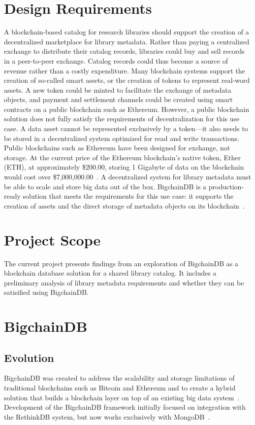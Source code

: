 \section{Design Requirements}
A blockchain-based catalog for research libraries should support the
creation of a decentralized marketplace for library metadata. Rather than
paying a centralized exchange to distribute their catalog records, libraries
could buy and sell records in a peer-to-peer exchange. Catalog records could
thus become a source of revenue rather than a costly expenditure. Many
blockchain systems support the creation of so-called smart assets, or the
creation of tokens to represent real-word assets. A new token could be
minted to facilitate the exchange of metadata objects, and payment and
settlement channels could be created using smart contracts on a public
blockchain such as Ethereum. However, a public blockchain solution does not
fully satisfy the requirements of decentralization for this use case. A data
asset cannot be represented exclusively by a token---it also needs to be
stored in a decentralized system optimized for read and write transactions.
Public blockchains such as Ethereum have been designed for exchange, not
storage. At the current price of the Ethereum blockchain's native token,
Ether (ETH), at approximately \$200.00, storing 1 Gigabyte of data on the
blockchain would cost over \$7,000,000.00~\cite{tHess16}. A decentralized
system for library metadata must be able to scale and store big data out of
the box. BigchainDB is a production-ready solution that meets the
requirements for this use case: it supports the creation of assets and the
direct storage of metadata objects on its blockchain~\cite{bdb18c}.

\section{Project Scope}
The current project presents findings from an exploration of BigchainDB as a 
blockchain database solution for a shared library catalog. It includes a 
preliminary analysis of library metadata requirements and whether they can be 
satisified using BigchainDB.

\section{BigchainDB}
\subsection{Evolution}
BigchainDB was created to address the scalability and storage
limitations of traditional blockchains such as Bitcoin and Ethereum and to
create a hybrid solution that builds a blockchain layer on top of an existing
big data system~\cite{bigDB18}. Development of the BigchainDB framework
initially focused on integration with the RethinkDB system, but now works
exclusively with MongoDB~\cite{ks16, bigDB18}.

